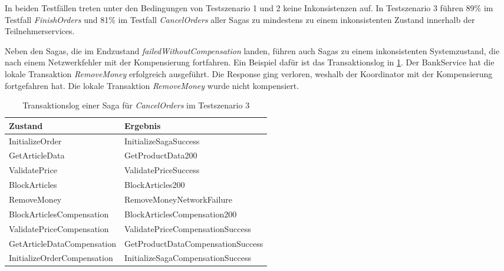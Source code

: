In beiden Testfällen treten unter den Bedingungen von Testszenario 1 und 2 keine Inkonsistenzen auf. In Testszenario 3 führen 89\% im Testfall \textit{FinishOrders} und 81\% im Testfall \textit{CancelOrders} aller Sagas zu mindestens zu einem inkonsistenten Zustand innerhalb der Teilnehmerservices. 

Neben den Sagas, die im Endzustand \textit{failedWithoutCompensation} landen, führen auch Sagas zu einem inkonsistenten Systemzustand, die nach einem Netzwerkfehler mit der Kompensierung fortfahren. Ein Beispiel dafür ist das Transaktionslog in \cref{tab:transaktionslog_cancelorders_ts3}. Der BankService hat die lokale Transaktion \textit{RemoveMoney} erfolgreich ausgeführt. Die Response ging verloren, weshalb der Koordinator mit der Kompensierung fortgefahren hat. Die lokale Transaktion \textit{RemoveMoney} wurde nicht kompensiert. 

\begin{center}
	\fontsize{9}{12}\selectfont
	\begin{longtable}[h]{|p{4.5cm}|p{5.5cm}|}
		\hline
		Zustand & Ergebnis \\* \hline
		\endhead
		\caption{Transaktionslog einer Saga für \textit{CancelOrders} im Testszenario 3}
		\label{tab:transaktionslog_cancelorders_ts3}
		\endfoot
		InitializeOrder & InitializeSagaSuccess \\ \hline
		GetArticleData & GetProductData200 \\ \hline
		ValidatePrice & ValidatePriceSuccess \\ \hline
		BlockArticles & BlockArticles200 \\ \hline
		\rowcolor{Gray}
		RemoveMoney & RemoveMoneyNetworkFailure \\ \hline
		\rowcolor{Gray}
		BlockArticlesCompensation & BlockArticlesCompensation200 \\ \hline
		ValidatePriceCompensation & ValidatePriceCompensationSuccess \\ \hline
		GetArticleDataCompensation & GetProductDataCompensationSuccess \\ \hline
		InitializeOrderCompensation & InitializeSagaCompensationSuccess \\ \hline
	\end{longtable}
\end{center}
\FloatBarrier
